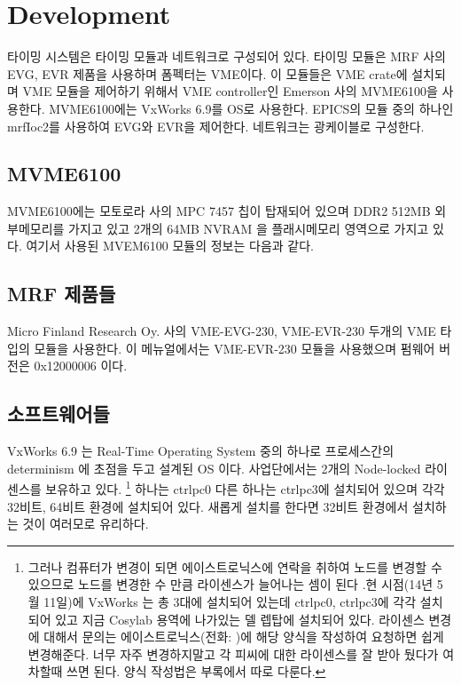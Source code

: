 \documentclass[11pt,a4paper]{article}
\begin{document}
\section{Development}
\vspace{0.5em}
타이밍 시스템은 타이밍 모듈과 네트워크로 구성되어 있다.
타이밍 모듈은 MRF 사의 EVG, EVR 제품을 사용하며 폼펙터는 VME이다.
이 모듈들은 VME crate에 설치되며 VME 모듈을 제어하기 위해서 VME controller인 
Emerson 사의 MVME6100을 사용한다.
MVME6100에는 VxWorks 6.9를 OS로 사용한다.
EPICS의 모듈 중의 하나인 mrfIoc2를 사용하여 EVG와 EVR을 제어한다.
네트워크는 광케이블로 구성한다. 

\subsection{MVME6100}
MVME6100에는 모토로라 사의 MPC 7457 칩이 탑재되어 있으며 DDR2 512MB 외부메모리를 가지고 있고
2개의 64MB NVRAM 을 플래시메모리 영역으로 가지고 있다. 여기서 사용된  MVEM6100 모듈의 정보는 다음과 같다.

\subsection{MRF 제품들}
Micro Finland Research Oy. 사의 VME-EVG-230, VME-EVR-230 두개의 VME 타입의 모듈을 사용한다.
이 메뉴얼에서는 VME-EVR-230 모듈을 사용했으며 펌웨어 버전은 0x12000006 이다.

\subsection{소프트웨어들}
VxWorks 6.9 는 Real-Time Operating System 중의 하나로 프로세스간의 determinism 에 초점을 두고 설계된 OS 이다.
사업단에서는 2개의 Node-locked 라이센스를 보유하고 있다.
\footnote{그러나 컴퓨터가 변경이 되면 에이스트로닉스에 연락을 취하여 노드를 변경할 수 있으므로 노드를 변경한 수 
만큼 라이센스가 늘어나는 셈이 된다 .현 시점(14년 5월 11일)에 VxWorks 는 총 3대에 설치되어 있는데 
ctrlpc0, ctrlpc3에 각각 설치되어 있고 지금 Cosylab 용역에 나가있는 델 렙탑에 설치되어 있다. 
라이센스 변경에 대해서 문의는 에이스트로닉스(전화: )에 해당 양식을 작성하여 요청하면
쉽게 변경해준다. 너무 자주 변경하지말고 각 피씨에 대한 라이센스를 잘 받아 뒀다가 여차할때 쓰면 된다.
양식 작성법은 부록에서 따로 다룬다.}
하나는 ctrlpc0 다른 하나는 ctrlpc3에 설치되어 있으며 각각 32비트, 64비트 환경에 설치되어 있다. 
새롭게 설치를 한다면 32비트 환경에서 설치하는 것이 여러모로 유리하다. \\
\end{document}
